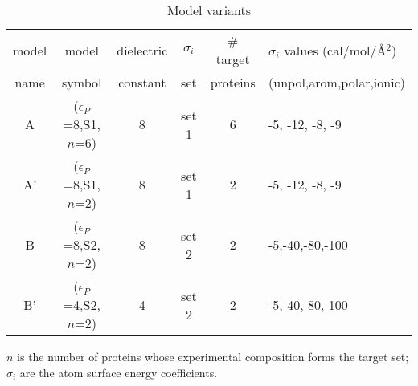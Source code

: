 \documentclass[12pt]{article}
\begin{document}
\begin{table}[h]                            
\caption{Model variants} \label{tab:models}                      
\begin{center} 
\begin{tabular}{cccccl} \hline \hline  
model & model            & dielectric & $\sigma_i$ & \# target & $\sigma_i$ values (cal/mol/\AA$^2$) \\
name  & symbol           & constant   &  set       & proteins  & (unpol,arom,polar,ionic) \\ \hline
A     & ($\epsilon_P$=8,S1,$n$=6) & 8 & set 1      & 6         & -5, -12, -8, -9   \\ 
A'    & ($\epsilon_P$=8,S1,$n$=2) & 8 & set 1      & 2         & -5, -12, -8, -9   \\ 
B     & ($\epsilon_P$=8,S2,$n$=2) & 8 & set 2      & 2         & -5,-40,-80,-100   \\
B'    & ($\epsilon_P$=4,S2,$n$=2) & 4 & set 2      & 2         & -5,-40,-80,-100   \\ \hline
\end{tabular}
\end{center}
{\small \noindent $n$ is the number of proteins whose experimental composition forms the target set; $\sigma_i$ are the
atom surface energy coefficients.}
\end{table}
\end{document}
